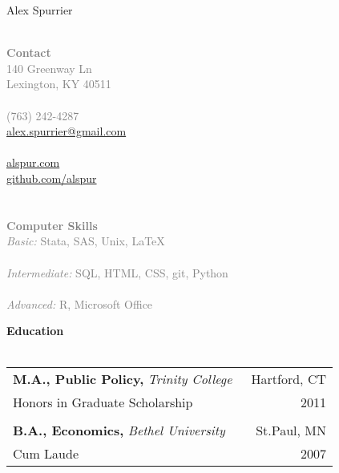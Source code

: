 \documentclass[letterpaper,11pt]{article}
\begin{document}
\noindent\fontsize{35}{40}\selectfont Alex Spurrier\\\\
\normalsize

\begin{vwcol}[widths={0.2,0.8},sep=1.5cm,justify=flush,rule=0pt,indent=0em]
\textcolor{Gray}{
\large\textbf{Contact} \\
\normalsize140 Greenway Ln \\
Lexington, KY 40511 \\\\
(763) 242-4287 \\
\href{mailto:alex.spurrier@gmail.com}{alex.spurrier@gmail.com} \\\\
\href{http://www.alspur.com/}{alspur.com} \\
\href{http://www.github.com/alspur}{github.com/alspur}\\\\\\
\nohyphens{\noindent\large\textbf{Computer Skills} \\
\normalsize\textit{Basic:} Stata, SAS, Unix, \LaTeX \\\\
\textit{Intermediate:} SQL, HTML, CSS, git, Python \\\\
\textit{Advanced:} R, Microsoft Office
}}
\newpage


{\Large\bfseries\color{Blue}Education} \\\\
\noindent\begin{tabular*}{0.7\textwidth}{l @{\extracolsep{\fill}} r}
  \textbf{M.A., Public Policy,} \textit{Trinity College} & \ {\color{Gray}Hartford, CT} \\ 
  Honors in Graduate Scholarship & \ {\color{Gray}2011} \\\\
  \textbf{B.A., Economics,} \textit{Bethel University} & \ {\color{Gray}St.Paul, MN} \\
  Cum Laude & \ {\color{Gray}2007} \\
\end{tabular*} \\\\\\



\end{vwcol}
\end{document}
